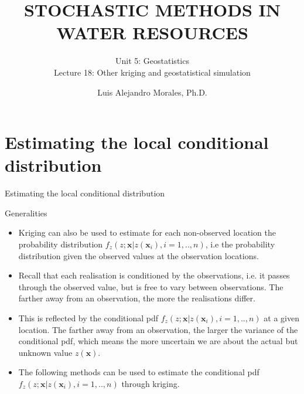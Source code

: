 \documentclass[8pt]{beamer}
\title{STOCHASTIC METHODS IN WATER RESOURCES}
\subtitle{Unit 5: Geostatistics \\ Lecture 18: Other kriging and geostatistical simulation}
\author{Luis Alejandro Morales, Ph.D.}
\institute{Universidad Nacional de Colombia \\ Department of Civil and Agriculture Engineering} %
\renewcommand{\emph}[1]{\textcolor{myorange}{#1}}
\begin{document}
\begin{frame}
    \titlepage
\end{frame}

\section{Estimating the local conditional distribution}
\begin{frame}{Estimating the local conditional distribution}
    \begin{block}{Generalities}
    \end{block}
        \begin{itemize}
            \item \emph{Kriging} can also be used to estimate for each \emph{non-observed location} the \emph{probability distribution} $f_z(z; \mathbf{x} | z(\mathbf{x}_i), i= 1, .., n)$, i.e the \emph{probability distribution} given the \emph{observed values} at the \emph{observation locations}.
            \item Recall that each \emph{realisation} is \emph{conditioned} by the \emph{observations}, i.e. it passes through the observed value, but is free to vary between observations. The farther away from an observation, the more the realisations differ.
            \item This is reflected by the \emph{conditional pdf} $f_z(z; \mathbf{x} | z(\mathbf{x}_i), i= 1, .., n)$ at a given location. The farther away from an observation, the larger the \emph{variance} of the \emph{conditional pdf}, which means the more \emph{uncertain} we are about the actual but unknown value $z(\mathbf{x})$.
            \item The following  methods can be used to estimate the \emph{conditional pdf} $f_z(z; \mathbf{x} | z(\mathbf{x}_i), i= 1, .., n)$ through kriging.
        \end{itemize}
\end{frame}
\end{document}
